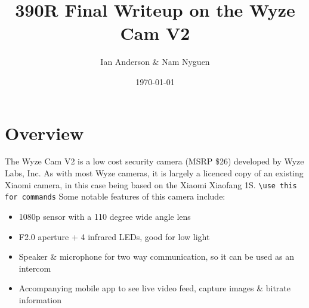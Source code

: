 \documentclass[a4paper, 11pt]{article}
\title{390R Final Writeup on the Wyze Cam V2}
\author{Ian Anderson \& Nam Nyguen}
\date{\today}
\begin{document}
\maketitle

\section{Overview}
The Wyze Cam V2 is a low cost security camera (MSRP \$26) developed by Wyze Labs, Inc. As with most Wyze cameras, it is largely a licenced copy of an existing Xiaomi camera, in this case being based on the Xiaomi Xiaofang 1S. \verb|\use this for commands|\newline\newline
Some notable features of this camera include:
\begin{itemize}
    \item 1080p sensor with a 110 degree wide angle lens
    \item F2.0 aperture + 4 infrared LEDs, good for low light
    \item Speaker \& microphone for two way communication, so it can be used as an intercom
    \item Accompanying mobile app to see live video feed, capture images \& bitrate information 
  \end{itemize}
\end{document}
